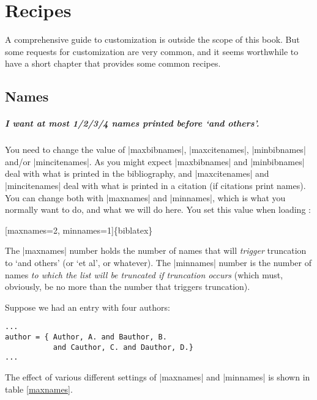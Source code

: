 \chapter{Recipes}

A comprehensive guide to customization is outside the scope of this book. But some requests for customization are very common, and it seems worthwhile to have a short chapter that provides some common recipes.

\section{Names}

\paragraph{I want at most 1/2/3/4 names printed before `and others'.} You need to change the value of |maxbibnames|, |maxcitenames|, |minbibnames| and/or |mincitenames|. As you might expect |maxbibnames| and |minbibnames| deal with what is printed in the bibliography, and |maxcitenames| and |mincitenames| deal with what is printed in a citation (if citations print names). You can change both with |maxnames| and |minnames|, which is what you normally want to do, and what we will do here. You set this value when loading \biblatex:
\begin{pseudoverb}
[maxnames=2, minnames=1]\{biblatex\}
\end{pseudoverb}

The |maxnames| number holds the number of names that will \emph{trigger} truncation to `and others' (or `et al', or whatever). The |minnames| number is the number of names \emph{to which the list will be truncated if truncation occurs} (which must, obviously, be no more than the number that triggers truncation).

Suppose we had an entry with four authors:
\begin{Verbatim}
...
author = { Author, A. and Bauthor, B.
           and Cauthor, C. and Dauthor, D.}
...
\end{Verbatim}

The effect of various different settings of |maxnames| and |minnames| is shown in table \ref{maxnames}.

